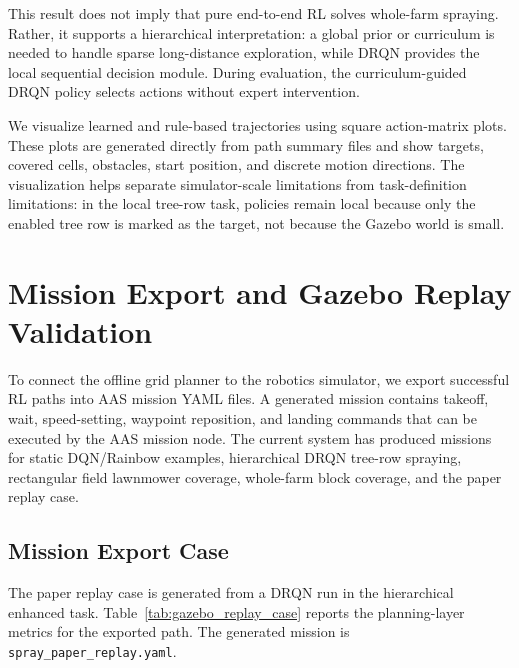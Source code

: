 \documentclass[conference,10pt]{IEEEtran}
\begin{document}
This result does not imply that pure end-to-end RL solves whole-farm spraying. Rather, it supports a hierarchical interpretation: a global prior or curriculum is needed to handle sparse long-distance exploration, while DRQN provides the local sequential decision module. During evaluation, the curriculum-guided DRQN policy selects actions without expert intervention.

We visualize learned and rule-based trajectories using square action-matrix plots. These plots are generated directly from path summary files and show targets, covered cells, obstacles, start position, and discrete motion directions. The visualization helps separate simulator-scale limitations from task-definition limitations: in the local tree-row task, policies remain local because only the enabled tree row is marked as the target, not because the Gazebo world is small.

\section{Mission Export and Gazebo Replay Validation}
To connect the offline grid planner to the robotics simulator, we export successful RL paths into AAS mission YAML files. A generated mission contains takeoff, wait, speed-setting, waypoint reposition, and landing commands that can be executed by the AAS mission node. The current system has produced missions for static DQN/Rainbow examples, hierarchical DRQN tree-row spraying, rectangular field lawnmower coverage, whole-farm block coverage, and the paper replay case.

\subsection{Mission Export Case}
The paper replay case is generated from a DRQN run in the hierarchical enhanced task. Table~\ref{tab:gazebo_replay_case} reports the planning-layer metrics for the exported path. The generated mission is \texttt{spray\_paper\_replay.yaml}.

\begin{table}[t]
\centering
\caption{Planning-layer metrics for the exported replay mission.}
\label{tab:gazebo_replay_case}
\end{table}
\end{document}
